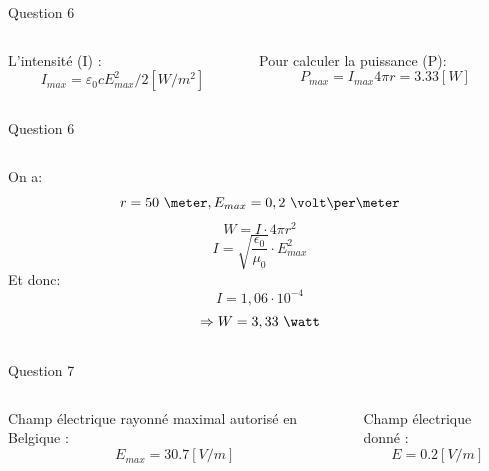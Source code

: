 \documentclass{beamer}
\begin{document}
\begin{frame}{Question 6}
	\begin{columns}
		\begin{column}{0.40\textwidth}
			\begin{center}
			L'intensité (I)  : 
			$$I_{max} = \varepsilon_0 c E_{max}^2/2 [W/m^2] $$
	    		
        		\end{center}
        	\end{column}
        	\begin{column}{0.40\textwidth}
			\begin{center}
	    Pour calculer la puissance (P):
	    $$ P_{max} = I_{max}4\pi r = 3.33 [W] $$
	    
        	\end{center}
        	\end{column}
        	\end{columns}
\end{frame}

\begin{frame}{Question 6}
	\begin{columns}
		\begin{column}{0.70\textwidth}
	    		On a:
			$$r = 50\ \meter, E_{max} = 0,2\ \volt\per\meter$$
			$$W = I \cdot 4\pi r^2$$
			$$I = \sqrt{\frac{\epsilon_0}{\mu_0}}\cdot E_{max}^2$$
			Et donc:
			$$I= 1,06\cdot10^{-4}$$
			$$\Rightarrow W = 3,33\ \watt$$
		
        		\end{column}
        	\end{columns}
\end{frame}

\begin{frame}{Question 7}
	\begin{columns}
		\begin{column}{0.40\textwidth}
			\begin{center}
			Champ électrique rayonné maximal autorisé en Belgique  : 
			$$E_{max} = 30.7 [V/m] $$
	    		
        		\end{center}
        	\end{column}
        	\begin{column}{0.40\textwidth}
			\begin{center}
	    Champ électrique donné : 
	    $$ E = 0.2 [V/m]$$
	    
        	\end{center}
        	\end{column}
        	\end{columns}
        	        	
\end{frame}
\end{document}
